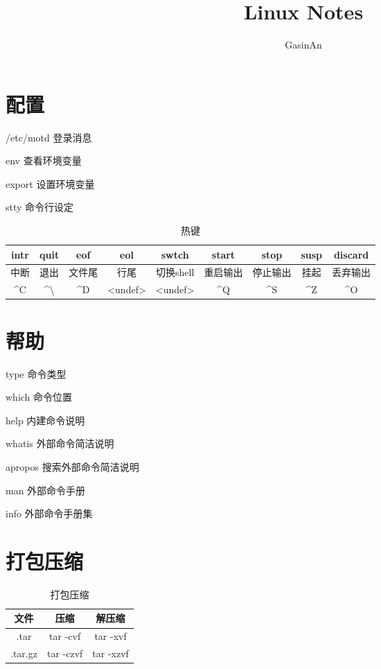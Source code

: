 \documentclass[12pt]{ctexart}
\title{Linux Notes}
\author{GasinAn}
\theoremstyle{definition}
\begin{document}
    \maketitle

    \tableofcontents

    \section{配置}

    /etc/motd 登录消息

    env 查看环境变量

    export 设置环境变量

    stty 命令行设定
    \begin{table}[htbp]
        \centering
        \begin{tabular}{|c|c|c|c|c|c|c|c|c|}
            \hline
            intr & quit & eof & eol & swtch & start & stop & susp & discard \\
            \hline
            中断 & 退出 & 文件尾 & 行尾 & 切换shell & 重启输出 & 停止输出 & 挂起 & 丢弃输出 \\
            \hline
            \^{}C & \^{}\textbackslash & \^{}D & <undef> & <undef> & \^{}Q & \^{}S & \^{}Z & \^{}O \\
            \hline
        \end{tabular}
        \caption{热键}
    \end{table}

    \section{帮助}

    type 命令类型

    which 命令位置

    help 内建命令说明

    whatis 外部命令简洁说明

    apropos 搜索外部命令简洁说明

    man 外部命令手册

    info 外部命令手册集

    \section{打包压缩}

    \begin{table}[htbp]
        \centering
        \begin{tabular}{|c|c|c}
            \hline
            文件 & 压缩 & 解压缩\\
            \hline
            .tar & tar -cvf & tar -xvf\\
            \hline
            .tar.gz & tar -czvf & tar -xzvf\\
            \hline
        \end{tabular}
        \caption{打包压缩}
    \end{table}
\end{document}
